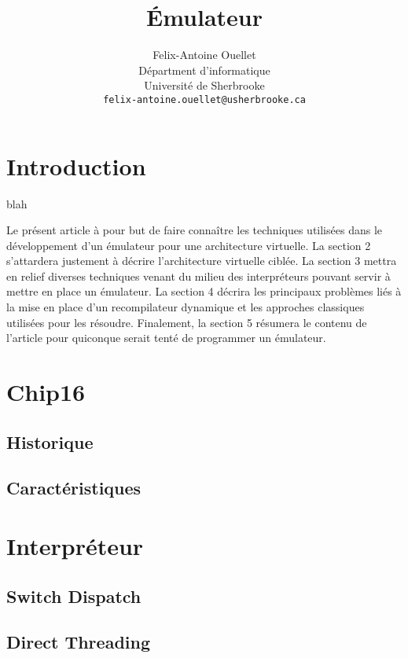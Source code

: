 \documentclass{article} %
\title{Émulateur}
\author{
Felix-Antoine Ouellet \\
Départment d'informatique \\
Université de Sherbrooke \\
\texttt{felix-antoine.ouellet@usherbrooke.ca} \\
}
\begin{document}
\maketitle

\begin{abstract}
\end{abstract}

\section{Introduction}
blah

Le présent article à pour but de faire connaître les techniques utilisées dans le développement d'un émulateur pour une architecture virtuelle. La section 2 s'attardera justement à décrire l'architecture virtuelle ciblée. La section 3 mettra en relief diverses techniques venant du milieu des interpréteurs pouvant servir à mettre en place un émulateur. La section 4 décrira les principaux problèmes liés à la mise en place d'un recompilateur dynamique et les approches classiques utilisées pour les résoudre. Finalement, la section 5 résumera le contenu de l'article pour quiconque serait tenté de programmer un émulateur.

\section{Chip16}

\subsection{Historique}

\subsection{Caractéristiques}

\section{Interpréteur}

\subsection{Switch Dispatch}

\subsection{Direct Threading}
\end{document}
